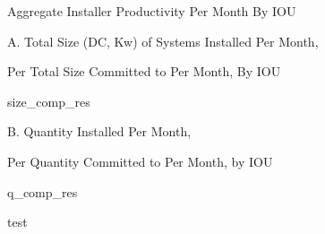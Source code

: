 \documentclass{article}
\begin{document}
\begin{table}
\begin{center}
Aggregate Installer Productivity Per Month By IOU

\vspace{0.5cm}

A. Total Size (DC, Kw) of Systems Installed Per Month, 

Per Total Size Committed to Per Month, By IOU

\vspace{0.25cm}

{size_comp_res}

\vspace{0.5cm}

B. Quantity Installed Per Month, 

Per Quantity Committed to Per Month, by IOU

\vspace{0.25cm}

{q_comp_res}
\end{center}
\caption{test}
\label{agg_prod_tab}
\end{table}
\end{document}
